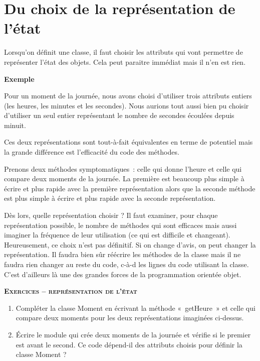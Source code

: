 \section{Du choix de la représentation de l'état}

Lorsqu'on définit une classe, il faut choisir les
attributs qui vont permettre de représenter l'état des
objets. Cela peut paraitre immédiat mais il n'en est
rien.

{\bfseries
Exemple}

Pour un moment de la journée, nous avons choisi
d'utiliser trois attributs entiers (les heures, les
minutes et les secondes). Nous aurions tout aussi bien pu choisir
d'utiliser un seul entier représentant le nombre de
secondes écoulées depuis minuit.

Ces deux représentations sont tout-à-fait équivalentes en terme de
potentiel mais la grande différence est l'efficacité
du code des méthodes. 

Prenons deux méthodes symptomatiques~: celle qui donne
l'heure et celle qui compare deux moments de la
journée. La première est beaucoup plus simple à écrire et plus rapide
avec la première représentation alors que la seconde méthode est plus
simple à écrire et plus rapide avec la seconde représentation.

Dès lors, quelle représentation choisir ? Il faut examiner, pour chaque
représentation possible, le nombre de méthodes qui sont efficaces mais
aussi imaginer la fréquence de leur utilisation (ce qui est difficile
et changeant). Heureusement, ce choix n'est pas
définitif. Si on change d'avis, on peut changer la
représentation. Il faudra bien sûr réécrire les méthodes de la classe
mais il ne faudra rien changer au reste du code, c-à-d les lignes du
code utilisant la classe. C’est d’ailleurs là une des grandes forces de
la programmation orientée objet.

{\sffamily\bfseries\scshape
Exercices – représentation de l'état}

\begin{enumerate}
	\item 
		Compléter la classe Moment en écrivant la méthode «~getHeure~» et celle
		qui compare deux moments pour les deux représentations imaginées
		ci-dessus.
	\item 
		Écrire le module qui crée deux moments de la journée et vérifie si le
		premier est avant le second. Ce code dépend-il des attributs choisis
		pour définir la classe Moment ?
\end{enumerate}

